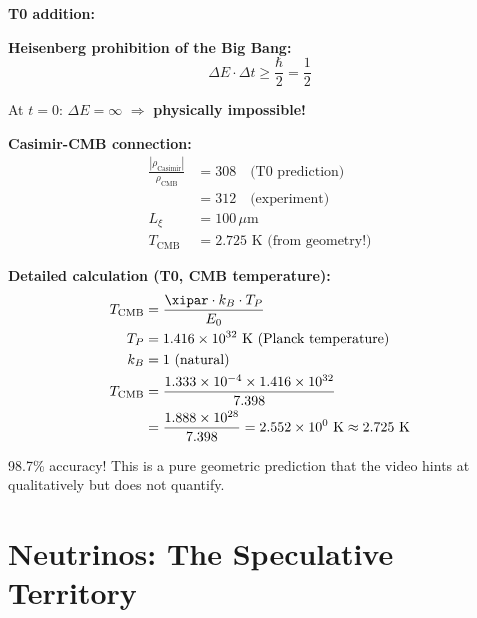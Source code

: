 	\begin{vorteil}
		\textbf{T0 addition:}
		
		\textbf{Heisenberg prohibition of the Big Bang:}
		\begin{equation}
			\Delta E \cdot \Delta t \geq \frac{\hbar}{2} = \frac{1}{2}
		\end{equation}
		
		At $t = 0$: $\Delta E = \infty$ $\Rightarrow$ \textbf{physically impossible!}
		
		\textbf{Casimir-CMB connection:}
		\begin{align}
			\frac{|\rho_{\text{Casimir}}|}{\rho_{\text{CMB}}} &= 308 \quad \text{(T0 prediction)} \\
			&= 312 \quad \text{(experiment)} \\
			L_\xi &= 100 \, \mu\text{m} \\
			T_{\text{CMB}} &= 2.725 \text{ K (from geometry!)}
		\end{align}
		
		\textbf{Detailed calculation (T0, CMB temperature):}
		\begin{align}
			T_{\text{CMB}} &= \frac{\xipar \cdot k_B \cdot T_P}{E_0} \\
			T_P &= 1.416 \times 10^{32} \text{ K (Planck temperature)} \\
			k_B &= 1 \text{ (natural)} \\
			T_{\text{CMB}} &= \frac{1.333 \times 10^{-4} \times 1.416 \times 10^{32}}{7.398} \\
			&= \frac{1.888 \times 10^{28}}{7.398} = 2.552 \times 10^0 \text{ K} \approx 2.725 \text{ K}
		\end{align}
		
		98.7\% accuracy! This is a pure geometric prediction that the video hints at qualitatively but does not quantify.
	\end{vorteil}
	
	\section{Neutrinos: The Speculative Territory}
	
